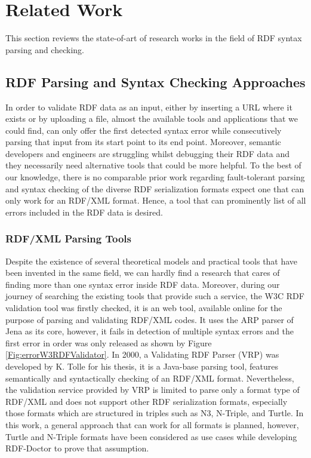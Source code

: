 \chapter{Related Work}
\label{ch:related}


This section reviews the state-of-art of research works in the field of RDF syntax parsing and checking.

\section{RDF Parsing and Syntax Checking Approaches}
In order to validate RDF data as an input, either by inserting a URL where it exists or by uploading a file, almost the available tools and applications that we could find, can only offer the first detected syntax error while consecutively parsing that input from its start point to its end point. Moreover, semantic developers and engineers are struggling whilst debugging their RDF data and they necessarily need alternative tools that could be more helpful. To the best of our knowledge, there is no comparable prior work regarding fault-tolerant parsing and syntax checking of the diverse RDF serialization formats expect one that can only work for an RDF/XML format. Hence, a tool that can prominently list of all errors included in the RDF data is desired.
\subsection{RDF/XML Parsing Tools}

 Despite the existence of  several theoretical models and practical tools that have been invented in the same field, we can hardly find a research that cares of finding more than one syntax error inside RDF data. Moreover, during our journey of searching the existing tools that provide such a service, the W3C RDF validation tool \cite{W3C:Validation:Online} was firstly checked, it is an web tool, available online for the purpose of parsing and validating RDF/XML codes. It uses the ARP parser of Jena \cite{McBride:2002:JSW:613357.613755} as its core, however, it fails in detection of multiple syntax errors and the first error in order was only released as shown by Figure \ref{Fig:errorW3RDFValidator}. In 2000, a Validating RDF Parser (VRP) \cite{karsten:Thesis:2000} was developed by K. Tolle for his thesis, it is a Java-base parsing tool, features semantically and syntactically checking of an RDF/XML format. Nevertheless, the validation service provided by VRP is limited to parse only a format type of RDF/XML and does not support other RDF serialization formats, especially those formats which are structured in triples such as N3, N-Triple, and Turtle. In this work, a general approach that can work for all formats is planned, however, Turtle and N-Triple formats have been considered as use cases while developing RDF-Doctor to prove that assumption. 
 
